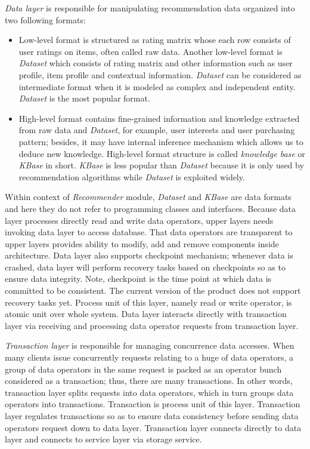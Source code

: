 \documentclass[a4paper]{llncs}
\begin{document}
\textit{Data layer} is responsible for manipulating recommendation data organized into two following formats:
\begin{itemize}
\item Low-level format is structured as rating matrix whose each row consists of user ratings on items, often called raw data. Another low-level format is \textit{Dataset} which consists of rating matrix and other information such as user profile, item profile and contextual information. \textit{Dataset} can be considered as intermediate format when it is modeled as complex and independent entity. \textit{Dataset} is the most popular format.
\item High-level format contains fine-grained information and knowledge extracted from raw data and \textit{Dataset}, for example, user interests and user purchasing pattern; besides, it may have internal inference mechanism which allows us to deduce new knowledge. High-level format structure is called \textit{knowledge base} or \textit{KBase} in short. \textit{KBase} is less popular than \textit{Dataset} because it is only used by recommendation algorithms while \textit{Dataset} is exploited widely.
\end{itemize}
Within context of \textit{Recommender} module, \textit{Dataset} and \textit{KBase} are data formats and here they do not refer to programming classes and interfaces. Because data layer processes directly read and write data operators, upper layers needs invoking data layer to access database. That data operators are transparent to upper layers provides ability to modify, add and remove components inside architecture. Data layer also supports checkpoint mechanism; whenever data is crashed, data layer will perform recovery tasks based on checkpoints so as to ensure data integrity. Note, checkpoint is the time point at which data is committed to be consistent. The current version of the product does not support recovery tasks yet. Process unit of this layer, namely read or write operator, is atomic unit over whole system. Data layer interacts directly with transaction layer via receiving and processing data operator requests from transaction layer.

\textit{Transaction layer} is responsible for managing concurrence data accesses. When many clients issue concurrently requests relating to a huge of data operators, a group of data operators in the same request is packed as an operator bunch considered as a transaction; thus, there are many transactions. In other words, transaction layer splits requests into data operators, which in turn groups data operators into transactions. Transaction is process unit of this layer. Transaction layer regulates transactions so as to ensure data consistency before sending data operators request down to data layer. Transaction layer connects directly to data layer and connects to service layer via storage service.
\end{document}

